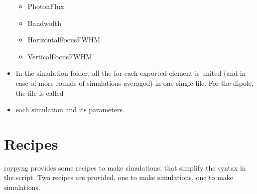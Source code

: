 \documentclass[letterpaper,10pt,english]{sphinxmanual}
\begin{document}
\begin{itemize}
\begin{itemize}
\item {} 
\sphinxAtStartPar
PhotonFlux

\item {} 
\sphinxAtStartPar
Bandwidth

\item {} 
\sphinxAtStartPar
HorizontalFocusFWHM

\item {} 
\sphinxAtStartPar
VerticalFocusFWHM

\end{itemize}

\item {} 
\sphinxAtStartPar
In the simulation folder, all the for each exported element
is united (and in case of more rounds of simulations averaged)
in one single file. For the dipole, the file is called 

\item {} 
\sphinxAtStartPar
{} each simulation and its parameters.

\end{itemize}


\section{Recipes}
\label{\detokenize{tutorial:recipes}}
\sphinxAtStartPar
raypyng provides some recipes to make simulations,
that simplify the syntax in the script.
Two recipes are provided, one to make  simulations,
one to make 
simulations.
\end{document}
